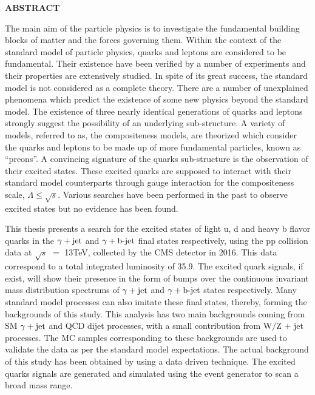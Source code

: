 \documentclass[12pt,a4]{article}
\begin{document}
\thispagestyle{empty}

\begin{center}
  \clearpage
  \vspace{5mm}
  \noindent\uppercase{\Large \textbf{Abstract}}
  \vspace{1cm}
\end{center}
\onehalfspacing
The main aim of the particle physics is to investigate the fundamental building blocks of matter and the forces governing them. Within the
context of the standard model of particle physics, quarks and leptons are considered to be fundamental. Their existence have been verified
by a number of experiments and their properties are extensively studied. In spite of its great success, the standard model is not considered as a
complete theory. There are a number of unexplained phenomena which predict the existence of some new physics beyond the standard model. The existence of three
nearly identical generations of quarks and leptons strongly suggest the possibility of an underlying sub-structure. A variety of models, referred to as,
the compositeness models, are theorized which consider the quarks and leptons to be made up of more fundamental particles, known as ``preons''. A convincing
signature of the quarks sub-structure is the observation of their excited states. These excited quarks are supposed to interact with
their standard model counterparts through gauge interaction for the compositeness scale, $\Lambda\le\sqrt{s}$. Various searches have been performed in the
past to observe excited states but no evidence has been found. 

This thesis presents a search for the excited states of light u, d and heavy b flavor quarks in the $\gamma+\mathrm{jet}$ and $\gamma+\mathrm{b}\textrm{-}\mathrm{jet}$ final states respectively, using the
pp collision data at $\sqrt{s}$ $=$ 13\unit{TeV}, collected by the CMS detector in 2016. This data correspond to a total integrated luminosity of
35.9\unit{\fbinv}. The excited quark signals, if exist, will show their presence in the form of bumps over the continuous invariant mass distribution spectrums
of $\gamma+\mathrm{jet}$ and $\gamma+\mathrm{b}\textrm{-}\mathrm{jet}$ states respectively. Many standard model processes can also imitate these final states, thereby, forming
the backgrounds of this study. This analysis has two main backgrounds coming from SM $\gamma+\mathrm{jet}$ and QCD dijet processes, with a small contribution from W$/$Z $+$ jet
processes. The MC samples corresponding to these backgrounds are used to validate the data as per the standard model expectations.
The actual background of this study has been
obtained by using a data driven technique. The excited quarks signals are generated and simulated using the event generator \pythia to scan a broad mass range.
\end{document}
